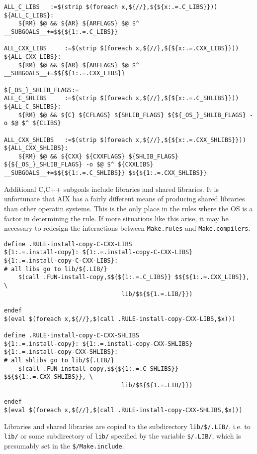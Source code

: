 \documentclass[letterpaper]{article}
\begin{document}
\begin{verbatim}
ALL_C_LIBS   :=$(strip $(foreach x,${//},${${x:.=.C_LIBS}}))
${ALL_C_LIBS}:
	${RM} $@ && ${AR} ${ARFLAGS} $@ $^
__SUBGOALS__+=$${${1:.=.C_LIBS}}

ALL_CXX_LIBS     :=$(strip $(foreach x,${//},${${x:.=.CXX_LIBS}}))
${ALL_CXX_LIBS}:
	${RM} $@ && ${AR} ${ARFLAGS} $@ $^
__SUBGOALS__+=$${${1:.=.CXX_LIBS}}

${_OS_}_SHLIB_FLAGS:=
ALL_C_SHLIBS     :=$(strip $(foreach x,${//},${${x:.=.C_SHLIBS}}))
${ALL_C_SHLIBS}:
	${RM} $@ && ${C} ${CFLAGS} ${SHLIB_FLAGS} ${${_OS_}_SHLIB_FLAGS} -o $@ $^ ${CLIBS}

ALL_CXX_SHLIBS   :=$(strip $(foreach x,${//},${${x:.=.CXX_SHLIBS}}))
${ALL_CXX_SHLIBS}:
	${RM} $@ && ${CXX} ${CXXFLAGS} ${SHLIB_FLAGS} ${${_OS_}_SHLIB_FLAGS} -o $@ $^ ${CXXLIBS}
__SUBGOALS__+=$${${1:.=.C_SHLIBS}} $${${1:.=.CXX_SHLIBS}}
\end{verbatim}
Additional C,C++ subgoals include libraries and shared libraries.  It is
unfortunate that AIX has a fairly different means of producing shared
libraries than other operatin systems.  This is the only place in the
rules where the OS is a factor in determining the rule.  If more situations
like this arise, it may be necessary to redesign the interactions
between \verb+Make.rules+ and \verb+Make.compilers+.

\begin{verbatim}
define .RULE-install-copy-C-CXX-LIBS
${1:.=.install-copy}: ${1:.=.install-copy-C-CXX-LIBS}
${1:.=.install-copy-C-CXX-LIBS}:
# all libs go to lib/${.LIB/}
	$(call .FUN-install-copy,$${${1:.=.C_LIBS}} $${${1:.=.CXX_LIBS}}, \
                                 lib/$${${1.=.LIB/}})

endef
$(eval $(foreach x,${//},$(call .RULE-install-copy-CXX-LIBS,$x)))

define .RULE-install-copy-C-CXX-SHLIBS
${1:.=.install-copy}: ${1:.=.install-copy-CXX-SHLIBS}
${1:.=.install-copy-CXX-SHLIBS}:
# all shlibs go to lib/${.LIB/}
	$(call .FUN-install-copy,$${${1:.=.C_SHLIBS}} $${${1:.=.CXX_SHLIBS}}, \
                                 lib/$${${1.=.LIB/}})

endef
$(eval $(foreach x,${//},$(call .RULE-install-copy-CXX-SHLIBS,$x)))
\end{verbatim}
Libraries and shared libraries are copied to the subdirectory
\verb+lib/$/.LIB/+, i.e. to \verb+lib/+ or some subdirectory of
\verb+lib/+ specified by the  variable \verb+$/.LIB/+, which is
presumably set in the \verb+$/Make.include+.
\end{document}
